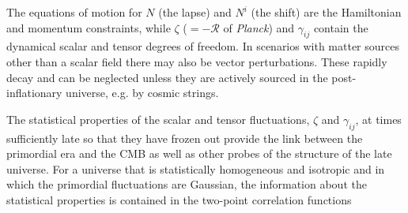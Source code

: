 The equations of motion for $N$ (the lapse) and $N^i$ (the shift) are the Hamiltonian and momentum constraints, while $\zeta$ ($=-\mathcal{R}$ of {\it Planck}) and $\gamma_{ij}$ contain the dynamical scalar and tensor degrees of freedom. In scenarios with matter sources other than a scalar field there may also be vector perturbations. These rapidly decay and can be neglected unless they are actively sourced in the post-inflationary universe, e.g. by cosmic strings.

The statistical properties of the scalar and tensor fluctuations, $\zeta$ and $\gamma_{ij}$, at times sufficiently late so that they have frozen out provide the link between the primordial era and the CMB as well as other probes of the structure of the late universe. For a universe that is statistically homogeneous and isotropic and in which the primordial fluctuations are Gaussian, the information about the statistical properties is contained in the two-point correlation functions




